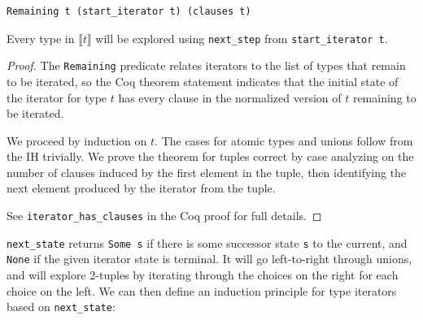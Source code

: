 \documentclass[a4paper,english]{lipics-v2019}
\newcommand{\denotes}[1]{\llbracket #1 \rrbracket}
\begin{document}
\begin{theorem}\begin{verbatim}
Remaining t (start_iterator t) (clauses t)
\end{verbatim}
Every type in $\denotes{t}$ will be explored using \verb|next_step| from \verb|start_iterator t|. 
\end{theorem}
\begin{proof}
The \verb|Remaining| predicate relates iterators to the list of types that remain to be iterated, so
the Coq theorem statement indicates that the initial state of the iterator for type $t$ has every clause
in the normalized version of $t$ remaining to be iterated.

We proceed by induction on $t$. The cases for atomic types and unions follow
from the IH trivially. We prove the theorem for tuples correct by case analyzing
on the number of clauses induced by the first element in the tuple, then identifying
the next element produced by the iterator from the tuple.

See \verb|iterator_has_clauses| in the Coq proof for full details.
\end{proof}

\verb|next_state| returns \verb|Some s| if there is some successor state
\verb|s| to the current, and \verb|None| if the given iterator state is
terminal. It will go left-to-right through unions, and will explore 2-tuples
by iterating through the choices on the right for each choice on the left. We can
then define an induction principle for type iterators based on \verb|next_state|:
\end{document}
